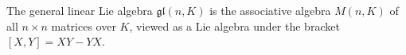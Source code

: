 The general linear Lie algebra $\mathfrak{gl}(n, K)$ is the associative algebra $M(n, K)$ of all $n \times n$ matrices over $K$, viewed as a Lie algebra under the bracket $[X, Y] = XY - YX$.
